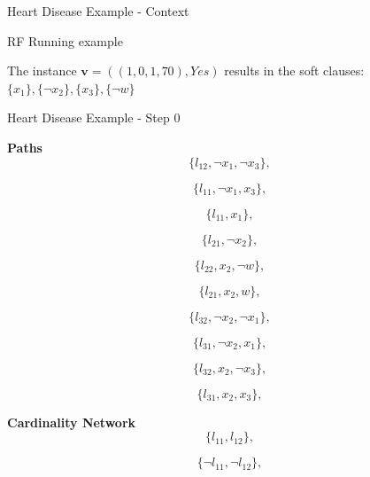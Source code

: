 \begin{frame}{Heart Disease Example - Context}
\begin{block}{RF Running example}
\begin{center}
\begin{center}
\begin{minipage}{0.265\linewidth}
            \end{minipage}
        \end{center}
        The instance $\textbf{v} = ((1,0,1,70), Yes)$ results in the soft clauses: $\{x_{1}\},\{ \lnot x_{2}\},\{x_{3}\},\{\lnot w\}$
        \vspace{2pt}
        \end{center}
    \end{block}
\end{frame}



\begin{frame}{Heart Disease Example - Step 0}
    \centering
    \fontsize{8pt}{1pt}\selectfont 
    \linespread{0.6}
    \begin{minipage}[t]{0.22\textwidth}
        \begin{block}{\centering \fontsize{8.5pt}{0pt}\selectfont \textbf{Paths}}
            \linespread{0.1}
            \[\{l_{12} , \lnot x_{1} , \lnot x_{3}\},\]
            \linespread{0.2}
            
            \[\{l_{11} , \lnot x_{1} , x_{3}\},\]
            
            \[\{l_{11} , x_{1}\},\]
            
            \[\{l_{21} , \lnot x_{2}\},\]
            
            \[\{l_{22} , x_{2}  , \lnot w\},\]
            
            \[\{l_{21} , x_{2}  , w\},\]
            
            \[\{l_{32} , \lnot x_{2} ,\lnot x_{1}\},\]
            
            \[\{l_{31} , \lnot x_{2} , x_{1}\},\]
            
            \[\{l_{32} , x_{2} , \lnot x_{3}\},\]
            
            \[\{l_{31} , x_{2} , x_{3}\},\]
            \vspace{2pt}
        \end{block}
    \end{minipage}
    \hspace{0.05\textwidth}
    \begin{minipage}[t]{0.19\textwidth}
        \begin{block}{\centering \fontsize{8.5pt}{2pt}\selectfont \textbf{Cardinality Network}}
            \linespread{0.3}
            \[\{l_{11} , l_{12}\},\]
            
            \[\{\lnot l_{11} , \lnot l_{12}\},\]
            

\end{block}
\end{minipage}
\end{frame}
